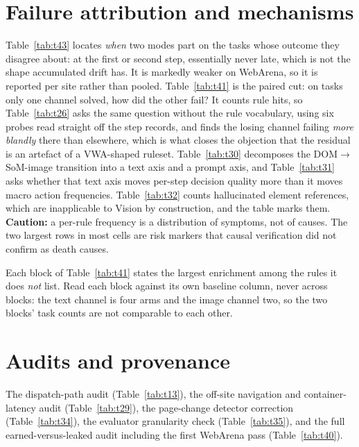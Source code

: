 \section{Failure attribution and mechanisms}\label{app:failures}

Table~\ref{tab:t43} locates \emph{when} two modes part on the tasks whose outcome they disagree about: at the first or second step, essentially never late, which is not the shape accumulated drift has. It is markedly weaker on WebArena, so it is reported per site rather than pooled. Table~\ref{tab:t41} is the paired cut: on tasks only one channel solved, how did the other fail? It counts rule hits, so Table~\ref{tab:t26} asks the same question without the rule vocabulary, using six probes read straight off the step records, and finds the losing channel failing \emph{more blandly} there than elsewhere, which is what closes the objection that the residual is an artefact of a VWA-shaped ruleset. Table~\ref{tab:t30} decomposes the DOM$\rightarrow$SoM-image transition into a text axis and a prompt axis, and Table~\ref{tab:t31} asks whether that text axis moves per-step decision quality more than it moves macro action frequencies. Table~\ref{tab:t32} counts hallucinated element references, which are inapplicable to Vision by construction, and the table marks them. \textbf{Caution:} a per-rule frequency is a distribution of symptoms, not of causes. The two largest rows in most cells are risk markers that causal verification did not confirm as death causes.


Each block of Table~\ref{tab:t41} states the largest enrichment among the rules it does \emph{not} list. Read each block against its own baseline column, never across blocks: the text channel is four arms and the image channel two, so the two blocks' task counts are not comparable to each other.








\section{Audits and provenance}\label{app:audits}

The dispatch-path audit (Table~\ref{tab:t13}), the off-site navigation and container-latency audit (Table~\ref{tab:t29}), the page-change detector correction (Table~\ref{tab:t34}), the evaluator granularity check (Table~\ref{tab:t35}), and the full earned-versus-leaked audit including the first WebArena pass (Table~\ref{tab:t40}).









